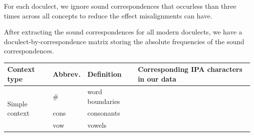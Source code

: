 \documentclass[a4paper]{article}
\begin{document}
For each doculect, we ignore sound correspondences
that occurless than three times across all concepts
to reduce the effect misalignments can have. 

After extracting the sound correspondences for
all modern doculects, we have a doculect-by-correspondence
matrix storing the absolute frequencies of the sound correspondences.

\begin{table}[]
\begin{tabular}{llll}
Context type & Abbrev. & Definition & Corresponding IPA characters in our data\\\hline
\multirow{3}{*}{Simple context} & \# & word boundaries & \\
    & cons & consonants & \\
    & vow & vowels & \\[3mm]


\end{tabular}
\end{table}
\end{document}
